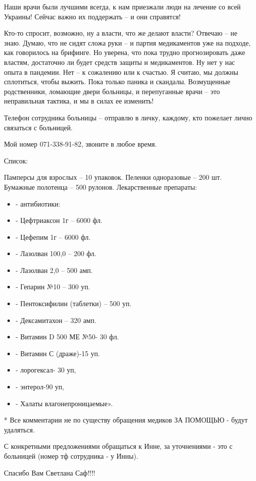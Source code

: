Наши врачи были лучшими всегда, к нам приезжали люди на лечение со всей
Украины! Сейчас важно их поддержать – и они справятся!

Кто-то спросит, возможно, ну а власти, что же делают власти? Отвечаю – не знаю.
Думаю, что не сидят сложа руки – и  партия медикаментов уже на подходе, как
говорилось на брифинге. Но уверена, что пока трудно прогнозировать даже
властям, достаточно ли будет средств защиты и медикаментов. Ну нет у нас опыта
в пандемии. Нет – к сожалению или к счастью. Я считаю, мы должны сплотиться,
чтобы выжить. Пока только паника и скандалы. Возмущенные родственники, ломающие
двери больницы, и перепуганные врачи – это неправильная тактика, и мы в силах
ее изменить!

Телефон сотрудника больницы – отправлю в личку, каждому, кто пожелает лично
связаться с больницей.

Мой номер 071-338-91-82, звоните в любое время.

Список:

Памперсы для взрослых – 10 упаковок.
Пеленки одноразовые – 200 шт.
Бумажные полотенца – 500 рулонов.
Лекарственные препараты:

\begin{itemize}
  \item - антибиотики:
  \item - Цефтриаксон 1г – 6000 фл.
  \item - Цефепим 1г – 6000 фл.
  \item - Лазолван 100,0 – 200 фл.
  \item - Лазолван 2,0 – 500 амп.
  \item - Гепарин №10 – 300 уп.
  \item - Пентоксифилин (таблетки) – 500 уп.
  \item - Дексамитахон – 320 амп.
  \item - Витамин D 500 МЕ №50- 30 фл.
  \item - Витамин С (драже)-15 уп.
  \item - лорогексал- 30 уп,
  \item - энтерол-90 уп, 
  \item - Халаты влагонепроницаемые».
\end{itemize}

* Все комментарии не по существу обращения медиков ЗА ПОМОЩЬЮ -  будут
удаляться.

С конкретными предложениями обращаться к Инне, за уточнениями - это с больницей
(номер тф сотрудника - у Инны).

\begin{itemize} %
Спасибо Вам Светлана Саф!!!!
\end{itemize} %
